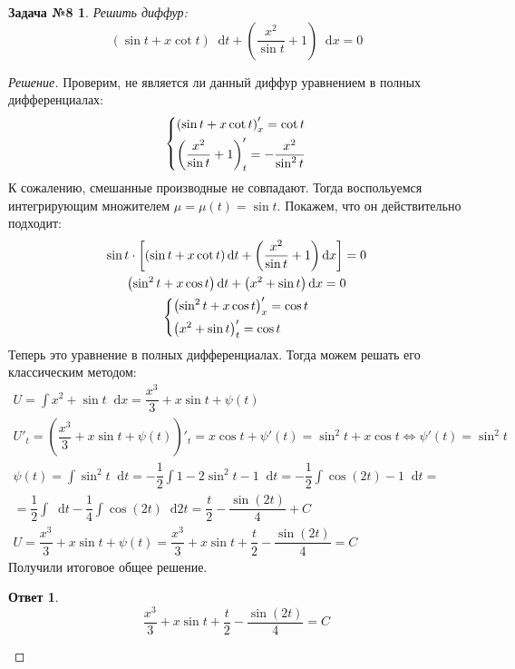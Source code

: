 \documentclass[a4paper,12pt]{article}
\newtheorem*{task8}{Задача №8}
\newtheorem*{ans}{Ответ}
\renewcommand*\d{\mathop{}\!\mathrm{d}}
\newcommand{\ds}{\displaystyle}
\begin{document}
\begin{task8}
	Решить диффур:
	\[(\sin t + x\cot t)\d t + \left(\dfrac{x^2}{\sin t} + 1\right)\d x = 0\]
\end{task8}
\begin{proof}[Решение]
	Проверим, не является ли данный диффур уравнением в полных дифференциалах:
	\[\left\{\begin{gathered}
	\left(\sin t + x\cot t\right)'_x = \cot t\hfill\\
	\left(\dfrac{x^2}{\sin t} + 1\right)'_t = -\dfrac{x^2}{\sin^2 t}\hfill
	\end{gathered}\right.\]	
	К сожалению, смешанные производные не совпадают. Тогда воспольуемся интегрирующим множителем $\mu = \mu(t) = \sin t$. Покажем, что он действительно подходит:
	\begin{gather*}
	\sin t \cdot \left[(\sin t + x\cot t)\d t + \left(\dfrac{x^2}{\sin t} + 1\right)\d x\right] = 0\\
	\left(\sin^2 t + x\cos t\right)\d t + \left(x^2 + \sin t\right)\d x = 0\\
	\left\{\begin{gathered}
	\left(\sin^2 t + x\cos t\right)'_x = \cos t\hfill\\
	\left(x^2 + \sin t\right)'_t = \cos t\hfill
	\end{gathered}\right.
	\end{gather*}
	Теперь это уравнение в полных дифференциалах. Тогда можем решать его классическим методом:
	\begin{gather*}
	U = \ds\int x^2 + \sin t\d x = \dfrac{x^3}{3} + x\sin t + \psi(t)\\
	U'_t = \left(\dfrac{x^3}{3} + x\sin t + \psi(t)\right)'_t = x\cos t + \psi'(t) = \sin^2 t + x\cos t \iff \psi'(t) = \sin^2 t\\
	\psi(t) = \ds\int \sin^2 t\d t = -\dfrac{1}{2}\ds\int 1 - 2\sin^2 t - 1 \d t = -\dfrac{1}{2}\ds\int \cos(2t) - 1 \d t  = \\
	= \dfrac{1}{2}\ds\int\d t - \dfrac{1}{4} \ds\int \cos(2t)\d 2t = \dfrac{t}{2} - \dfrac{\sin(2t)}{4} + C\\
	U = \dfrac{x^3}{3} + x\sin t + \psi(t) = \dfrac{x^3}{3} + x\sin t + \dfrac{t}{2} - \dfrac{\sin(2t)}{4} = C
	\end{gather*}
	Получили итоговое общее решение.
	\begin{ans}
		\[\dfrac{x^3}{3} + x\sin t + \dfrac{t}{2} - \dfrac{\sin(2t)}{4} = C\]
	\end{ans}
\end{proof}
\end{document}

